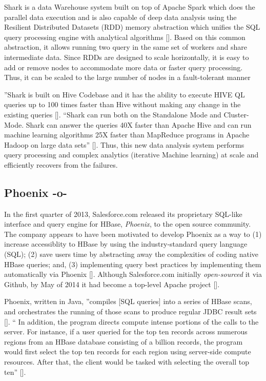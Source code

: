 Shark is a data Warehouse system built on top of Apache Spark which
does the parallel data execution and is also capable of deep data
analysis using the Resilient Distributed Datasets (RDD) memory
abstraction which unifies the SQL query processing engine with
analytical algorithms [\cite{shark-paper-2012}]. Based on this common
abstraction, it allows running two query in the same set of workers
and share intermediate data. Since RDDs are designed to scale
horizontally, it is easy to add or remove nodes to accommodate more
data or faster query processing. Thus, it can be scaled to the large
number of nodes in a fault-tolerant manner

''Shark is built on Hive Codebase and it has the ability to execute
HIVE QL queries up to 100 times faster than Hive without making any
change in the existing queries [\cite{shark-paper-2012}]. ``Shark can
run both on the Standalone Mode and Cluster-Mode. Shark can answer the
queries 40X faster than Apache Hive and can run machine learning
algorithms 25X faster than MapReduce programs in Apache Hadoop on
large data sets'' [\cite{shark-paper-2012}]. Thus, this new data
analysis system performs query processing and complex analytics
(iterative Machine learning) at scale and efficiently recovers from
the failures.

\subsection{Phoenix -o-}

In the first quarter of 2013, Salesforce.com released its proprietary
SQL-like interface and query engine for HBase, \textit{Phoenix}, to the open
source community.  The company appears to have been motivated to
develop Phoenix as a way to (1) increase accessiblity to HBase by using
the industry-standard query language (SQL); (2) save users time by
abstracting away the complexities of coding native HBase queries; and,
(3) implementing query best practices by implementing them
automatically via Phoenix [\cite{www-phoenix-cloudera}]. Although
Salesforce.com initially \textit{open-sourced} it via Github, by May of 2014
it had become a top-level Apache project [\cite{www-phoenix-wikipedia}].

Phoenix, written in Java, ''compiles [SQL queries] into a series of
HBase scans, and orchestrates the running of those scans to produce
regular JDBC result sets [\cite{www-apachephoenix-org}]. `` In addition,
the program directs compute intense portions of the calls to the
server.  For instance, if a user queried for the top ten records
across numerous regions from an HBase database consisting of a billion
records, the program would first select the top ten records for each
region using server-side compute resources.  After that, the client
would be tasked with selecting the overall top
ten'' [\cite{www-phoenix-salesforcedev}].

